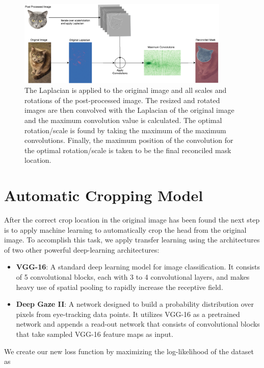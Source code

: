 \documentclass[portrait]{sciposter}
\begin{document}
\begin{multicols}{2}
\begin{figure}
	\centering
	\includegraphics[width=0.9\textwidth]{ImageReconciliation.png}
	\caption{\small The Laplacian is applied to the original image and all scales and rotations of the post-processed image. The resized and rotated images are then convolved with the Laplacian of the original image and the maximum convolution value is calculated. The optimal rotation/scale is found by taking the maximum of the maximum convolutions. Finally, the maximum position of the convolution for the optimal rotation/scale is taken to be the final reconciled mask location.}
\end{figure}

\section*{Automatic Cropping Model}

After the correct crop location in the original image has been found the next step is to apply machine learning to automatically crop the head from the original image. To accomplish this task, we apply transfer learning using the architectures of two other powerful deep-learning architectures:

\begin{itemize}
    \item  \textbf{VGG-16}: A standard deep learning model for image classification. It consists of 5 convolutional blocks, each with 3 to 4 convolutional layers, and makes heavy use of spatial pooling to rapidly increase the receptive field. 

    \item  \textbf{Deep Gaze II}: A network designed to build a probability distribution over pixels from eye-tracking data points. It utilizes VGG-16 as a pretrained network and appends a read-out network that consists of convolutional blocks that take sampled VGG-16 feature maps as input.
\end{itemize}

We create our new loss function by maximizing the log-likelihood of the dataset as


\end{multicols}
\end{document}
